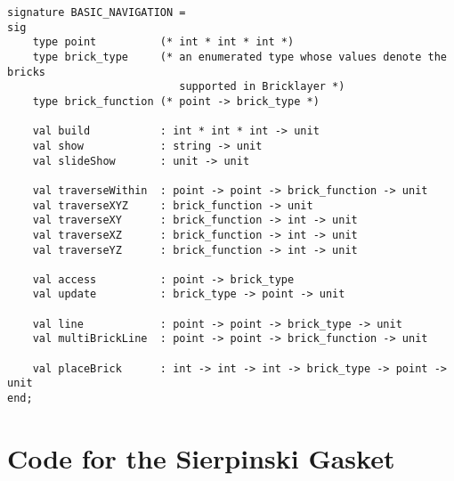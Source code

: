 \documentclass[submission,copyright,creativecommons]{eptcs}
\begin{document}
\begin{lstlisting}
signature BASIC_NAVIGATION =
sig
    type point          (* int * int * int *)
    type brick_type     (* an enumerated type whose values denote the bricks
                           supported in Bricklayer *)
    type brick_function (* point -> brick_type *)

    val build           : int * int * int -> unit
    val show            : string -> unit
    val slideShow       : unit -> unit

    val traverseWithin  : point -> point -> brick_function -> unit
    val traverseXYZ     : brick_function -> unit
    val traverseXY      : brick_function -> int -> unit
    val traverseXZ      : brick_function -> int -> unit
    val traverseYZ      : brick_function -> int -> unit

    val access          : point -> brick_type
    val update          : brick_type -> point -> unit

    val line            : point -> point -> brick_type -> unit
    val multiBrickLine  : point -> point -> brick_function -> unit

    val placeBrick      : int -> int -> int -> brick_type -> point -> unit
end;
\end{lstlisting}

\newpage
\section{Code for the Sierpinski Gasket}\label{appendix-sierpinski}
\end{document}
